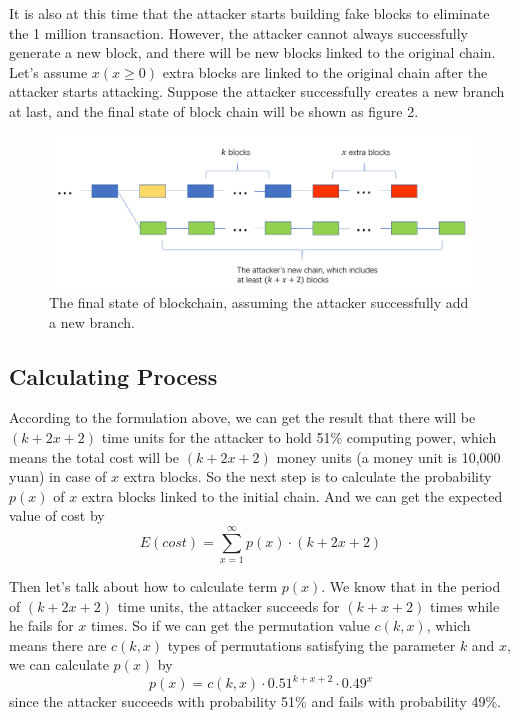 \documentclass{article}
\begin{document}
It is also at this time that the attacker starts building fake blocks to eliminate the 1 million transaction. However, the attacker cannot always successfully generate a new block, and there will be new blocks linked to the original chain. Let's assume $x(x\ge 0)$ extra blocks are linked to the original chain after the attacker starts attacking. Suppose the attacker successfully creates a new branch at last, and the final state of block chain will be shown as figure 2.
\begin{figure}[h]
    \centering
    \includegraphics[width=0.9\linewidth]{HW2_2.PNG}
    \caption{The final state of blockchain, assuming the attacker successfully add a new branch.}
\end{figure}

\subsection*{Calculating Process}
According to the formulation above, we can get the result that there will be $(k+2x+2)$ time units for the attacker to hold 51\% computing power, which means the total cost will be $(k+2x+2)$ money units (a money unit is 10,000 yuan) in case of $x$ extra blocks. So the next step is to calculate the probability $p(x)$ of $x$ extra blocks linked to the initial chain. And we can get the expected value of cost by
\begin{equation}
    E(cost)=\sum_{x=1}^{\infty} p(x)\cdot (k+2x+2)
\end{equation}

Then let's talk about how to calculate term $p(x)$. We know that in the period of $(k+2x+2)$ time units, the attacker succeeds for $(k+x+2)$ times while he fails for $x$ times. So if we can get the permutation value $c(k,x)$, which means there are $c(k,x)$ types of permutations satisfying the parameter $k$ and $x$, we can calculate $p(x)$ by
\begin{equation}
    p(x)=c(k,x)\cdot 0.51^{k+x+2}\cdot 0.49^{x}
\end{equation}
since the attacker succeeds with probability 51\% and fails with probability 49\%.
\end{document}
